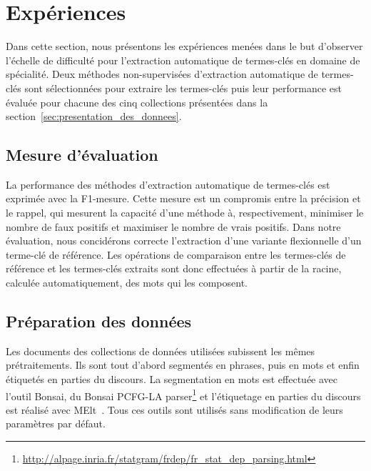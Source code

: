 \section{Expériences}
\label{sec:experiences}
  Dans cette section, nous présentons les expériences menées dans le but
  d'observer l'échelle de difficulté pour l'extraction automatique de
  termes-clés en domaine de spécialité. Deux méthodes non-supervisées
  d'extraction automatique de termes-clés sont sélectionnées pour extraire les
  termes-clés puis leur performance est évaluée pour chacune des cinq
  collections présentées dans la section~\ref{sec:presentation_des_donnees}.

  \subsection{Mesure d'évaluation}
  \label{subsec:mesure_d_evaluation}
    La performance des méthodes d'extraction automatique de termes-clés est
    exprimée avec la F1-mesure. Cette mesure est un compromis entre la précision
    et le rappel, qui mesurent la capacité d'une méthode à, respectivement,
    minimiser le nombre de faux positifs et maximiser le nombre de vrais
    positifs. Dans notre évaluation, nous concidérons correcte l'extraction
    d'une variante flexionnelle d'un terme-clé de référence. Les opérations de
    comparaison entre les termes-clés de référence et les termes-clés extraits
    sont donc effectuées à partir de la racine, calculée automatiquement, des
    mots qui les composent.

  \subsection{Préparation des données}
  \label{subsec:preparation_des_donnees}
    Les documents des collections de données utilisées subissent les mêmes
    prétraitements. Ils sont tout d'abord segmentés en phrases, puis en mots et
    enfin étiquetés en parties du discours. La segmentation en mots est
    effectuée avec l'outil Bonsai, du Bonsai PCFG-LA
    parser\footnote{\url{http://alpage.inria.fr/statgram/frdep/fr_stat_dep_parsing.html}}
    et l'étiquetage en parties du discours est réalisé avec
    MElt~\cite{denis2009melt}. Tous ces outils sont utilisés sans modification
    de leurs paramètres par défaut.

